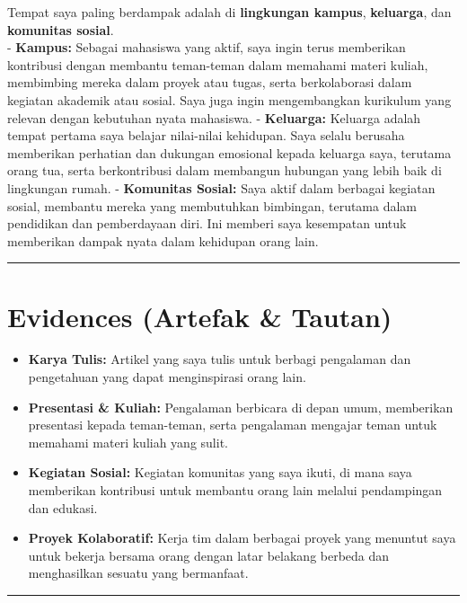 \documentclass[
  letterpaper,
  DIV=11,
  numbers=noendperiod]{scrreprt}
\providecommand{\tightlist}{%
  \setlength{\itemsep}{0pt}\setlength{\parskip}{0pt}}
\begin{document}
Tempat saya paling berdampak adalah di \textbf{lingkungan kampus},
\textbf{keluarga}, dan \textbf{komunitas sosial}.\\
- \textbf{Kampus:} Sebagai mahasiswa yang aktif, saya ingin terus
memberikan kontribusi dengan membantu teman-teman dalam memahami materi
kuliah, membimbing mereka dalam proyek atau tugas, serta berkolaborasi
dalam kegiatan akademik atau sosial. Saya juga ingin mengembangkan
kurikulum yang relevan dengan kebutuhan nyata mahasiswa. -
\textbf{Keluarga:} Keluarga adalah tempat pertama saya belajar
nilai-nilai kehidupan. Saya selalu berusaha memberikan perhatian dan
dukungan emosional kepada keluarga saya, terutama orang tua, serta
berkontribusi dalam membangun hubungan yang lebih baik di lingkungan
rumah. - \textbf{Komunitas Sosial:} Saya aktif dalam berbagai kegiatan
sosial, membantu mereka yang membutuhkan bimbingan, terutama dalam
pendidikan dan pemberdayaan diri. Ini memberi saya kesempatan untuk
memberikan dampak nyata dalam kehidupan orang lain.

\begin{center}\rule{0.5\linewidth}{0.5pt}\end{center}

\section{Evidences (Artefak \& Tautan)}\label{evidences-artefak-tautan}

\begin{itemize}
\tightlist
\item
  \textbf{Karya Tulis:} Artikel yang saya tulis untuk berbagi pengalaman
  dan pengetahuan yang dapat menginspirasi orang lain.
\item
  \textbf{Presentasi \& Kuliah:} Pengalaman berbicara di depan umum,
  memberikan presentasi kepada teman-teman, serta pengalaman mengajar
  teman untuk memahami materi kuliah yang sulit.
\item
  \textbf{Kegiatan Sosial:} Kegiatan komunitas yang saya ikuti, di mana
  saya memberikan kontribusi untuk membantu orang lain melalui
  pendampingan dan edukasi.
\item
  \textbf{Proyek Kolaboratif:} Kerja tim dalam berbagai proyek yang
  menuntut saya untuk bekerja bersama orang dengan latar belakang
  berbeda dan menghasilkan sesuatu yang bermanfaat.
\end{itemize}

\begin{center}\rule{0.5\linewidth}{0.5pt}\end{center}
\end{document}
